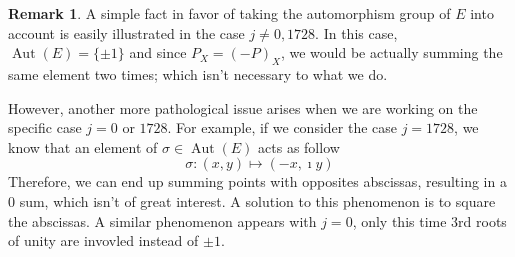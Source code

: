 \documentclass[12pt]{article}
\theoremstyle{plain}
\theoremstyle{definition}
\newtheorem*{remark}{Remark}
\DeclareMathOperator{\Aut}{Aut}
\begin{document}
\begin{remark}
A simple fact in favor of taking the automorphism group of $E$ into account is
easily illustrated in the case $j\neq0,1728$. In this case, $\Aut(E) =
\lbrace{\pm1}\rbrace$ and since $P_X = (-P)_X$, we would be actually summing the
same element two times; which isn't necessary to what we do.

However, another more pathological issue arises when we are working on the
specific case $j = 0$ or $1728$. For example, if we consider the case $j =
1728$, we know that an element of $\sigma\in\Aut(E)$ acts as follow
\[
\sigma:(x,y)\mapsto(-x,\imath y)
\]
Therefore, we can end up summing points with opposites abscissas, resulting in a
$0$ sum, which isn't of great interest. A solution to this phenomenon is to
square the abscissas. A similar phenomenon appears with $j = 0$, only this time
$3$rd roots of unity are invovled instead of $\pm1$.
\end{remark}
\end{document}
